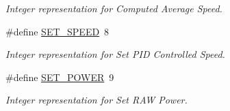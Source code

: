 \begin{DoxyCompactItemize}
\begin{DoxyCompactList}\small\item\em Integer representation for Computed Average Speed. \item\end{DoxyCompactList}\item 
\hypertarget{group___bro_fist_ga4653087e4d2deccaf2f685236780eacf}{
\#define \hyperlink{group___bro_fist_ga4653087e4d2deccaf2f685236780eacf}{SET\_\-SPEED}~8}
\label{group___bro_fist_ga4653087e4d2deccaf2f685236780eacf}

\begin{DoxyCompactList}\small\item\em Integer representation for Set PID Controlled Speed. \item\end{DoxyCompactList}\item 
\hypertarget{group___bro_fist_ga7235481a21fc46d0534161c40cb10ee5}{
\#define \hyperlink{group___bro_fist_ga7235481a21fc46d0534161c40cb10ee5}{SET\_\-POWER}~9}
\label{group___bro_fist_ga7235481a21fc46d0534161c40cb10ee5}

\begin{DoxyCompactList}\small\item\em Integer representation for Set RAW Power. \item\end{DoxyCompactList}\end{DoxyCompactItemize}


